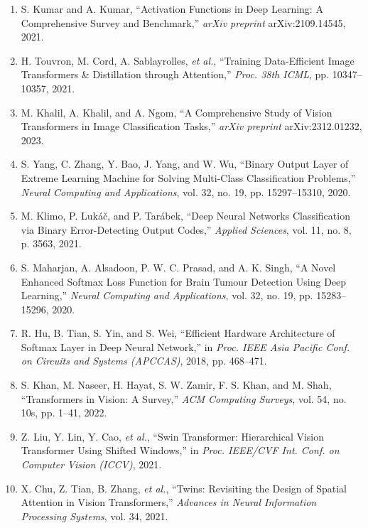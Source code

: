 \begin{enumerate}
\item S. Kumar and A. Kumar, ``Activation Functions in Deep Learning: A Comprehensive Survey and Benchmark,'' \textit{arXiv preprint} arXiv:2109.14545, 2021.

\item H. Touvron, M. Cord, A. Sablayrolles, \textit{et al.}, ``Training Data-Efficient Image Transformers \& Distillation through Attention,'' \textit{Proc. 38th ICML}, pp. 10347--10357, 2021.

\item M. Khalil, A. Khalil, and A. Ngom, ``A Comprehensive Study of Vision Transformers in Image Classification Tasks,'' \textit{arXiv preprint} arXiv:2312.01232, 2023.

\item S. Yang, C. Zhang, Y. Bao, J. Yang, and W. Wu, ``Binary Output Layer of Extreme Learning Machine for Solving Multi-Class Classification Problems,'' \textit{Neural Computing and Applications}, vol. 32, no. 19, pp. 15297--15310, 2020.

\item M. Klimo, P. Luk\'{a}\v{c}, and P. Tar\'{a}bek, ``Deep Neural Networks Classification via Binary Error-Detecting Output Codes,'' \textit{Applied Sciences}, vol. 11, no. 8, p. 3563, 2021.

\item S. Maharjan, A. Alsadoon, P. W. C. Prasad, and A. K. Singh, ``A Novel Enhanced Softmax Loss Function for Brain Tumour Detection Using Deep Learning,'' \textit{Neural Computing and Applications}, vol. 32, no. 19, pp. 15283--15296, 2020.

\item R. Hu, B. Tian, S. Yin, and S. Wei, ``Efficient Hardware Architecture of Softmax Layer in Deep Neural Network,'' in \textit{Proc. IEEE Asia Pacific Conf. on Circuits and Systems (APCCAS)}, 2018, pp. 468--471.

\item S. Khan, M. Naseer, H. Hayat, S. W. Zamir, F. S. Khan, and M. Shah, ``Transformers in Vision: A Survey,'' \textit{ACM Computing Surveys}, vol. 54, no. 10s, pp. 1--41, 2022.

\item Z. Liu, Y. Lin, Y. Cao, \textit{et al.}, ``Swin Transformer: Hierarchical Vision Transformer Using Shifted Windows,'' in \textit{Proc. IEEE/CVF Int. Conf. on Computer Vision (ICCV)}, 2021.

\item X. Chu, Z. Tian, B. Zhang, \textit{et al.}, ``Twins: Revisiting the Design of Spatial Attention in Vision Transformers,'' \textit{Advances in Neural Information Processing Systems}, vol. 34, 2021.


\end{enumerate}
